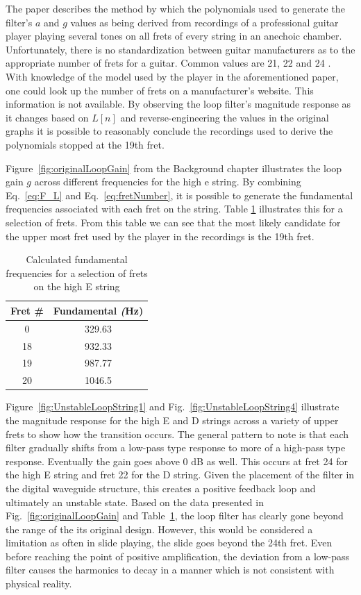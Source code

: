 \documentclass[../main.tex]{subfiles}
\begin{document}
The paper describes the method by which the polynomials used to generate the filter's $a$ and $g$ values as being derived from recordings of a professional guitar player playing several tones on all frets of every string in an anechoic chamber. Unfortunately, there is no standardization between guitar manufacturers as to the appropriate number of frets for a guitar. Common values are 21, 22 and 24 . With knowledge of the model used by the player in the aforementioned paper, one could look up the number of frets on a manufacturer's website. This information is not available. By observing the loop filter's magnitude response as it changes based on $L[n]$ and reverse-engineering the values in the original graphs it is possible to reasonably conclude the recordings used to derive the polynomials stopped at the 19th fret.

Figure~\ref{fig:originalLoopGain} from the Background chapter illustrates the loop gain $g$ across different frequencies for the high e string. By combining Eq.~\ref{eq:F_L} and Eq.~\ref{eq:fretNumber}, it is possible to generate the fundamental frequencies associated with each fret on the string. Table \ref{tab:eStringFrets} illustrates this for a selection of frets. From this table we can see that the most likely candidate for the upper most fret used by the player in the recordings is the 19th fret.

\begin{table}[h]
\centering
\begin{tabular}{|c| c|} 
 \hline
 \textbf{Fret \#} & \textbf{Fundamental} \emph(Hz) \\ [0.5ex] 
 \hline
 0 & 329.63\\
 18 & 932.33\\
 19 & 987.77\\
 20 & 1046.5\\
 \hline
\end{tabular}
\caption{Calculated fundamental frequencies for a selection of frets on the high E string}
\label{tab:eStringFrets}
\end{table}

Figure~\ref{fig:UnstableLoopString1} and Fig.~\ref{fig:UnstableLoopString4} illustrate the magnitude response for the high E and D strings across a variety of upper frets to show how the transition occurs. The general pattern to note is that each filter gradually shifts from a low-pass type response to more of a high-pass type response. Eventually the gain goes above 0 dB as well. This occurs at fret 24 for the high E string and fret 22 for the D string. Given the placement of the filter in the digital waveguide structure, this creates a positive feedback loop and ultimately an unstable state. Based on the data presented in Fig.~\ref{fig:originalLoopGain} and Table~\ref{tab:eStringFrets}, the loop filter has clearly gone beyond the range of the its original design. However, this would be considered a limitation as often in slide playing, the slide goes beyond the 24th fret. Even before reaching the point of positive amplification, the deviation from a low-pass filter causes the harmonics to decay in a manner which is not consistent with physical reality. 
\end{document}
